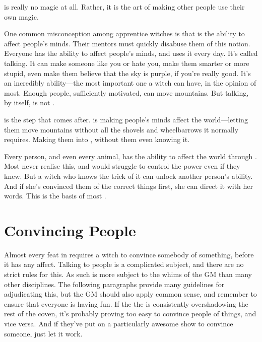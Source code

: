 
 is really no magic at all.
Rather, it is the art of making other people use their own magic.

One common misconception among apprentice witches is that  is the ability to affect people's minds.
Their mentors must quickly disabuse them of this notion.
Everyone has the ability to affect people's minds, and uses it every day.
It's called talking.
It can make someone like you or hate you, make them smarter or more stupid, even make them believe that the sky is purple, if you're really good.
It's an incredibly ability---the most important one a witch can have, in the opinion of most.
Enough people, sufficiently motivated, can move mountains.
But talking, by itself, is not .

 is the step that comes after.
 is making people's minds affect the world---letting them move mountains without all the shovels and wheelbarrows it normally requires.
Making them into , without them even knowing it.

Every person, and even every animal, has the ability to affect the world through .
Most never realise this, and would struggle to control the power even if they knew.
But a witch who knows the trick of it can unlock another person's ability.
And if she's convinced them of the correct things first, she can direct it with her words.
This is the basis of most .

\section{Convincing People}

Almost every feat in  requires a witch to convince somebody of something, before it has any affect.
Talking to people is a complicated subject, and there are no strict rules for this.
As such  is more subject to the whims of the GM than many other disciplines.
The following paragraphs provide many guidelines for adjudicating this, but the GM should also apply common sense, and remember to ensure that everyone is having fun.
If the the  is consistently overshadowing the rest of the coven, it's probably proving too easy to convince people of things, and vice versa.
And if they've put on a particularly awesome show to convince someone, just let it work.

